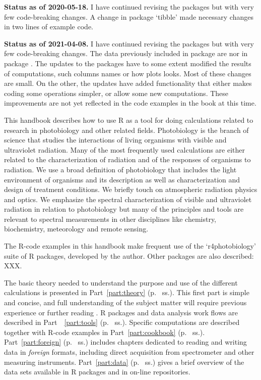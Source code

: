 \begin{shaded}
\noindent
\textbf{Status as of 2020-05-18.} I have continued revising the packages but with very few code-breaking changes. A change in package `tibble' made necessary changes in two lines of example code.
\end{shaded}

\begin{shaded}
\noindent
\textbf{Status as of 2021-04-08.} I have continued revising the packages but with very few code-breaking changes. The data previously included in package  are nor in package . The updates to the packages have to some extent modified the results of computations, such columns names or how plots looks. Most of these changes are small. On the other, the updates have added functionality that either makes coding some operations simpler, or allow some new computations. These improvements are not yet reflected in the code examples in the book at this time.
\end{shaded}

This handbook describes how to use R as a tool for doing calculations related to research in photobiology and other related fields. Photobiology is the branch of science that studies the interactions of living organisms with visible and ultraviolet radiation. Many of the most frequently used calculations are either related to the characterization of radiation and of the responses of organisms to radiation. We use a broad definition of photobiology that includes the light environment of organisms and its description as well as characterization and design of treatment conditions. We briefly touch on atmospheric radiation physics and optics. We emphasize the spectral characterization of visible and ultraviolet radiation in relation to photobiology but many of the principles and tools are relevant to spectral measurements in other disciplines like chemistry, biochemistry, meteorology and remote sensing.

The R-code examples in this handbook make frequent use of the `r4photobiology' suite of R packages, developed by the author. Other packages are also described: XXX.

The basic theory needed to understand the purpose and use of the different calculations is presented in Part~\ref{part:theory} (p.~\pageref{part:theory} ss.). This first part is simple and concise, and full understanding of the subject matter will require previous experience or further reading \autocite[e.g.][]{Aphalo2012,Bjoern2015}.
R packages and data analysis work flows are described in Part~~\ref{part:tools} (p.~\pageref{part:tools} ss.).
Specific computations are described together with R-code examples in Part~\ref{part:cookbook} (p.~\pageref{part:cookbook} ss.).
Part~\ref{part:foreign} (p.~\pageref{part:foreign} ss.) includes chapters dedicated to reading and writing data in \emph{foreign} formats, including direct acquisition from spectrometer and other measuring instruments. Part~\ref{part:data} (p.~\pageref{part:data} ss.) gives a brief overview of the data sets available in R packages and in on-line repositories.

